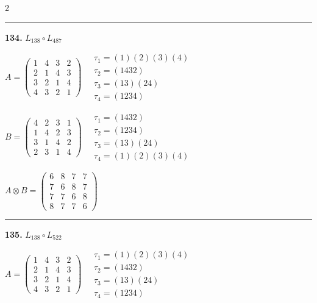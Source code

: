 \begin{multicols}{2}
\vspace{0.3em}
\hrule
\vspace{0.3em}

\noindent\textbf{134.} $L_{138} \circ L_{487}$

$A = \begin{pmatrix} 1 & 4 & 3 & 2 \\ 2 & 1 & 4 & 3 \\ 3 & 2 & 1 & 4 \\ 4 & 3 & 2 & 1 \end{pmatrix} \quad \begin{matrix} \tau_{1}=(1)(2)(3)(4) \\ \tau_{2}=(1 4 3 2) \\ \tau_{3}=(1 3)(2 4) \\ \tau_{4}=(1 2 3 4) \end{matrix}$

$B = \begin{pmatrix} 4 & 2 & 3 & 1 \\ 1 & 4 & 2 & 3 \\ 3 & 1 & 4 & 2 \\ 2 & 3 & 1 & 4 \end{pmatrix} \quad \begin{matrix} \tau_{1}=(1 4 3 2) \\ \tau_{2}=(1 2 3 4) \\ \tau_{3}=(1 3)(2 4) \\ \tau_{4}=(1)(2)(3)(4) \end{matrix}$

$A \otimes B = \begin{pmatrix} 6 & 8 & 7 & 7 \\ 7 & 6 & 8 & 7 \\ 7 & 7 & 6 & 8 \\ 8 & 7 & 7 & 6 \end{pmatrix}$

\vspace{0.3em}
\hrule
\vspace{0.3em}

\noindent\textbf{135.} $L_{138} \circ L_{522}$

$A = \begin{pmatrix} 1 & 4 & 3 & 2 \\ 2 & 1 & 4 & 3 \\ 3 & 2 & 1 & 4 \\ 4 & 3 & 2 & 1 \end{pmatrix} \quad \begin{matrix} \tau_{1}=(1)(2)(3)(4) \\ \tau_{2}=(1 4 3 2) \\ \tau_{3}=(1 3)(2 4) \\ \tau_{4}=(1 2 3 4) \end{matrix}$


\end{multicols}
